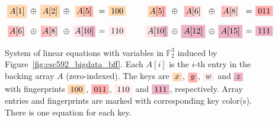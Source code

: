 \begin{figure}[H]
\centering  
\[
\setlength{\arraycolsep}{2pt}
\begin{array}{cccccccccccccc}

\mathcolorbox{lightorange}{A[1]} 
&\oplus& \mathcolorbox{lightorange}{A[2]} 
&\oplus& \gradientmathbox{lightorange}{lightred}{A[5]} 
&=& \mathcolorbox{lightorange}{100} &\qquad

\gradientmathbox{lightorange}{lightred}{A[5]} 
&\oplus& \gradientmathbox{lightred}{lightpink}{A[6]} 
&\oplus& \gradientmathbox{lightred}{lightpink}{A[8]} 
&=& \mathcolorbox{lightred}{011}\\[1em]

\gradientmathbox{lightred}{lightpink}{A[6]} 
&\oplus& \gradientmathbox{lightred}{lightpink}{A[8]} 
&\oplus& \gradientmathbox{lightpink}{lightpurple}{A[10]} 
&=& \mathcolorbox{lightpink}{110} &\qquad

\gradientmathbox{lightpink}{lightpurple}{A[10]} 
&\oplus& \mathcolorbox{lightpurple}{A[12]} 
&\oplus& \mathcolorbox{lightpurple}{A[15]} 
&=& \mathcolorbox{lightpurple}{111}
\end{array}
\]
\caption{System of linear equations with variables in $\mathbb{F}^3_2$ induced by Figure~\ref{fig:csc592_bigdata_bff}. Each $A[i]$ is the $i$-th entry in the 
backing array $A$ (zero-indexed). The keys are $\mathcolorbox{lightorange}{x}$, $\mathcolorbox{lightred}{y}$, $\mathcolorbox{lightpink}{w}$ and 
$\mathcolorbox{lightpurple}{z}$ with fingerprints $\mathcolorbox{lightorange}{100}$, $\mathcolorbox{lightred}{011}$, $\mathcolorbox{lightpink}{110}$ and 
$\mathcolorbox{lightpurple}{111}$, respectively. Array entries and fingerprints are marked with corresponding key color(s). There is one equation for each key.}
\label{fig:csc592_bigdata_soe}
\end{figure}